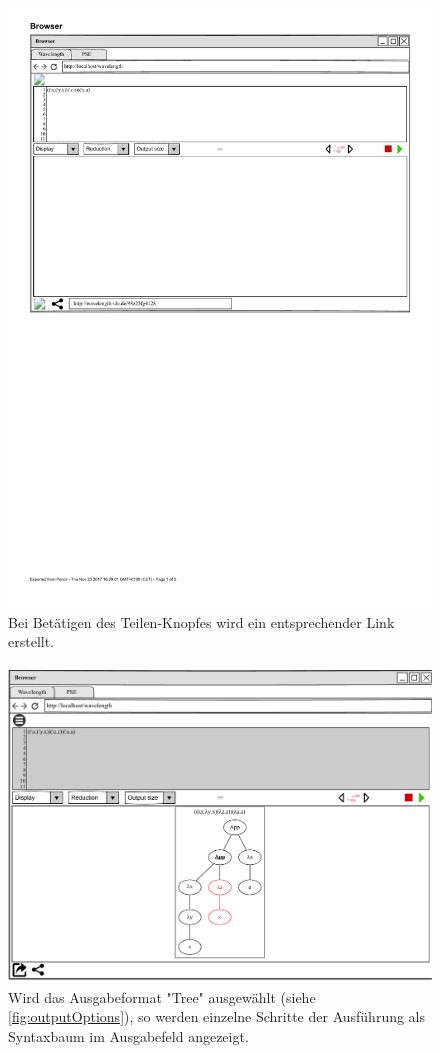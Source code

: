 \documentclass[parskip=full,11pt,twoside]{scrartcl}
\begin{document}
{\begin{figure}[H]
	\centering
	\includegraphics{img/share}
	\caption{Bei Betätigen des Teilen-Knopfes wird ein entsprechender Link erstellt.}
	\label{img:share}
\end{figure}


\begin{figure}[H]
	\centering
	\includegraphics[width=\textwidth]{img/displayTree1}
	\caption{\label{fig:tree}Wird das Ausgabeformat "Tree" ausgewählt (siehe \cref{fig:outputOptions}), so werden einzelne Schritte der Ausführung als Syntaxbaum im Ausgabefeld angezeigt.}
\end{figure}


}
\end{document}
